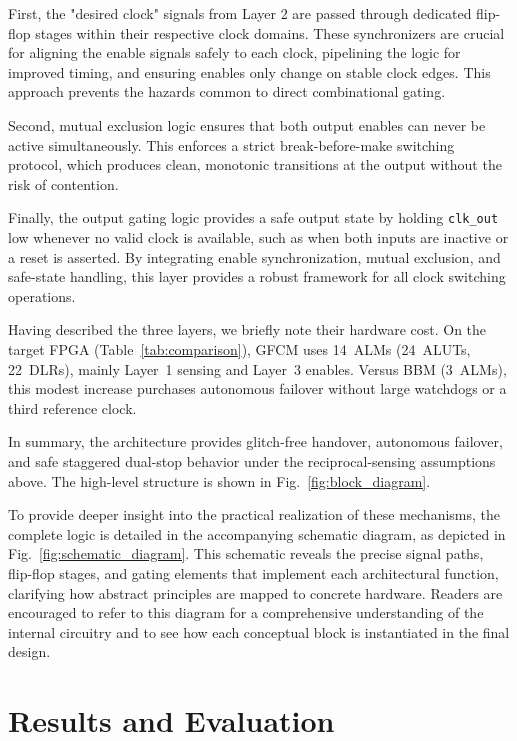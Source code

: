 \documentclass[conference]{IEEEtran}
\begin{document}
First, the "desired clock" signals from Layer 2 are passed through dedicated flip-flop stages within their respective clock domains. These synchronizers are crucial for aligning the enable signals safely to each clock, pipelining the logic for improved timing, and ensuring enables only change on stable clock edges. This approach prevents the hazards common to direct combinational gating.

Second, mutual exclusion logic ensures that both output enables can never be active simultaneously. This enforces a strict break-before-make switching protocol, which produces clean, monotonic transitions at the output without the risk of contention.

Finally, the output gating logic provides a safe output state by holding \texttt{clk\_out} low whenever no valid clock is available, such as when both inputs are inactive or a reset is asserted. By integrating enable synchronization, mutual exclusion, and safe-state handling, this layer provides a robust framework for all clock switching operations.

Having described the three layers, we briefly note their hardware cost. On the target FPGA (Table~\ref{tab:comparison}), GFCM uses 14~ALMs (24~ALUTs, 22~DLRs), mainly Layer~1 sensing and Layer~3 enables. Versus BBM (3~ALMs), this modest increase purchases autonomous failover without large watchdogs or a third reference clock.

\vspace{0.5em}
In summary, the architecture provides glitch-free handover, autonomous failover, and safe staggered dual-stop behavior under the reciprocal-sensing assumptions above. The high-level structure is shown in Fig.~\ref{fig:block_diagram}.





To provide deeper insight into the practical realization of these mechanisms, the complete logic is detailed in the accompanying schematic diagram, as depicted in Fig.~\ref{fig:schematic_diagram}. This schematic reveals the precise signal paths, flip-flop stages, and gating elements that implement each architectural function, clarifying how abstract principles are mapped to concrete hardware. Readers are encouraged to refer to this diagram for a comprehensive understanding of the internal circuitry and to see how each conceptual block is instantiated in the final design.


\section{Results and Evaluation}
\label{sec:results}
\end{document}
